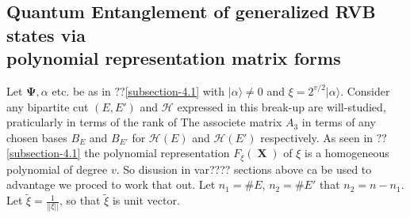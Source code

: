 \documentclass[a4paper,12pt]{article}
\DeclareMathOperator{\x}{\mathrm{X}}
\theoremstyle{definition}
\theoremstyle{underlinethm}
\theoremstyle{definition}
\begin{document}
\subsection{Quantum Entanglement of generalized RVB states via\\ polynomial representation matrix forms}\label{subsection-4.2}

Let $\boldsymbol{\Psi}, \alpha$ etc. be as in $??$\ref{subsection-4.1} with $| \alpha \rangle \neq 0$ and $\xi = 2^{v/2} | \alpha \rangle$. Consider any bipartite cut $(E, E')$ and $\mathcal{H}$ expressed in this break-up are will-studied, praticularly in terms of the rank of The associete  matrix $A_{3}$ in terms of any chosen bases $B_{E}$ and $B_{E'}$ for $\mathcal{H}(E)$ and $\mathcal{H}(E')$ respectively. As seen in $??$\ref{subsection-4.1} the polynomial representation $F_{\xi}(\boldsymbol{\x})$ of $\xi$ is a homogeneous polynomial of degree $v$. So disusion in var???? sections above ca be used to advantage we proced to work that out. Let $n_{1}=\# E$, $n_{2} = \#E'$ that $n_{2}= n-n_{1}$. Let $\tilde{\xi} = \frac{1}{|| \xi ||}$, so that $\tilde{\xi}$ is unit vector.
\end{document}
